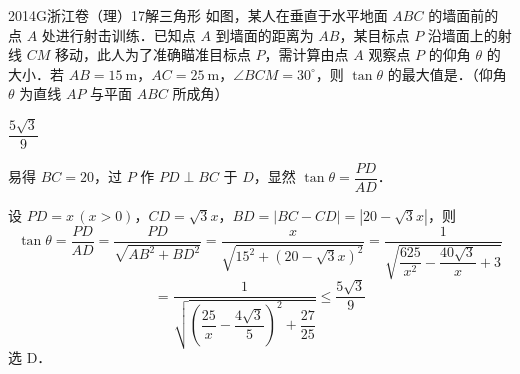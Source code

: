 
\begin{problem}{2014}{G}{浙江卷（理）}{17}{解三角形}
如图，某人在垂直于水平地面 $ ABC $ 的墙面前的点 $ A $ 处进行射击训练．已知点 $ A $ 到墙面的距离为 $ AB $，某目标点 $ P $ 沿墙面上的射线 $ CM $ 移动，此人为了准确瞄准目标点 $ P $，需计算由点 $ A $ 观察点 $ P $ 的仰角 $ \theta $ 的大小．若 $ AB=15\ \mathrm{m} $，$ AC=25\ \mathrm{m} $，$ \angle BCM=30^\circ $，则 $ \tan\theta $ 的最大值是\hspace{1cm}．（仰角 $ \theta $ 为直线 $ AP $ 与平面 $ ABC $ 所成角）
\end{problem}

\begin{answer}
$\dfrac{5\sqrt{3}}{9}$
\end{answer}

\begin{solutions}
易得 $ BC=20 $，过 $ P $ 作 $ PD\perp BC $ 于 $ D $，显然 $ \tan\theta=\dfrac{PD}{AD} $．

设 $ PD=x\,(x>0) $，$ CD=\sqrt{3}x $，$ BD=|BC-CD|=\left|20-\sqrt{3}x\right| $，则
$$
\tan\theta=\dfrac{PD}{AD}=\dfrac{PD}{\sqrt{AB^2+BD^2}}=\dfrac{x}{\sqrt{15^2+\left(20-\sqrt{3}x\right)^2}}=\dfrac{1}{\sqrt{\dfrac{625}{x^2}-\dfrac{40\sqrt{3}}{x}+3}}
$$
$$
=\dfrac{1}{\sqrt{\left(\dfrac{25}{x}-\dfrac{4\sqrt{3}}{5}\right)^2+\dfrac{27}{25}}}\leqslant\dfrac{5\sqrt{3}}{9}
$$
选 D．
\end{solutions}
